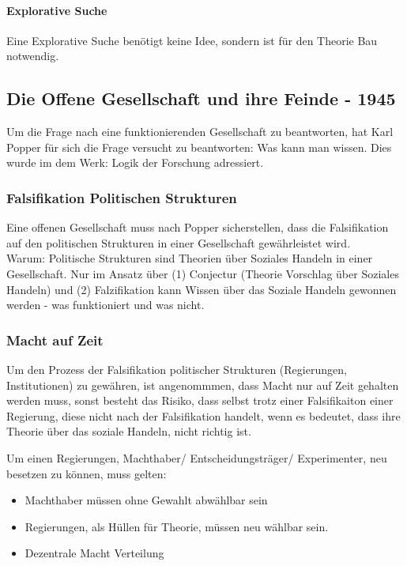 \paragraph{Explorative Suche}
Eine Explorative Suche benötigt keine Idee, sondern ist für den Theorie Bau notwendig. 

\subsection{Die Offene Gesellschaft und ihre Feinde - 1945}
Um die Frage nach eine funktionierenden Gesellschaft zu beantworten, hat Karl Popper für sich die Frage versucht zu beantworten: Was kann man wissen. Dies wurde im dem Werk: Logik der Forschung adressiert.

\subsubsection{Falsifikation Politischen Strukturen}
Eine offenen Gesellschaft muss nach Popper sicherstellen, dass die Falsifikation auf den politischen Strukturen in einer Gesellschaft gewährleistet wird.\\

Warum: Politische Strukturen sind Theorien über Soziales Handeln in einer Gesellschaft. Nur im Ansatz über (1) Conjectur (Theorie Vorschlag über Soziales Handeln) und (2) Falzifikation kann Wissen über das Soziale Handeln gewonnen werden - was funktioniert und was nicht.



\subsubsection{Macht auf Zeit}
Um den Prozess der Falsifikation politischer Strukturen (Regierungen, Institutionen) zu gewähren, ist angenommmen, dass Macht nur auf Zeit gehalten werden muss, sonst besteht das Risiko, dass selbst trotz einer Falsifikaiton einer Regierung, diese nicht nach der Falsifikation handelt, wenn es bedeutet, dass ihre Theorie über das soziale Handeln, nicht richtig ist.

Um einen Regierungen, Machthaber/ Entscheidungsträger/ Experimenter, neu besetzen zu können, muss gelten:
\begin{itemize}
	\item Machthaber müssen ohne Gewahlt abwählbar sein
	\item Regierungen, als Hüllen für Theorie, müssen neu wählbar sein.
	\item Dezentrale Macht Verteilung
\end{itemize}

